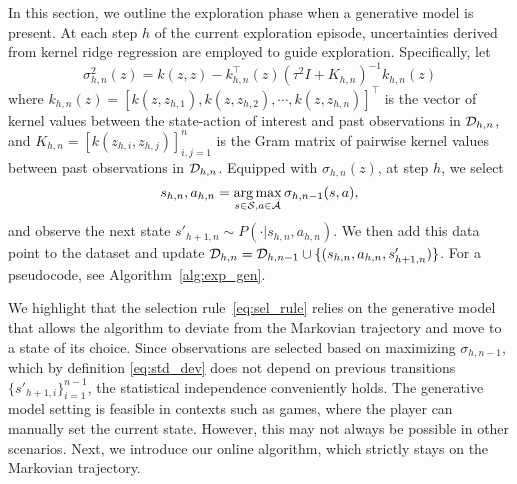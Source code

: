 In this section, we outline the exploration phase when a generative model is present. At each step $h$ of the current exploration episode, uncertainties derived from kernel ridge regression are employed to guide exploration. Specifically, let
\begin{equation} \label{eq:std_dev}
   \sigma^2_{h,n}(z) = k(z,z) -k^{\top}_{h,n}(z)(\tau^2I+K_{h,n})^{-1}k_{h,n}(z) 
\end{equation}
where $k_{h,n}(z) = [k(z,z_{h,1}),k(z,z_{h,2}), \cdots, k(z,z_{h,n}) ]^{\top}$ is the vector of kernel values between the state-action of interest and past observations in $\mathcal{D}_{h,n}$, and $K_{h,n}=[k(z_{h,i}, z_{h,j})]_{i,j=1}^n$ is the Gram matrix of pairwise kernel values between past observations in $\mathcal{D}_{h,n}$. Equipped with $\sigma_{h,n}(z)$, at step $h$, we select
\begin{equation}\label{eq:sel_rule}
    s_{h,n}, a_{h,n}=\operatorname*{arg\,max}_{s\in\mathcal{S},a\in\mathcal{A}} \sigma_{h,n-1}(s,a),
\end{equation}
and observe the next state $s'_{h+1,n}\sim P(\cdot|s_{h,n}, a_{h,n})$. We then add this data point to the dataset and update $\mathcal{D}_{h,n}=\mathcal{D}_{h,n-1}\cup\{(s_{h,n}, a_{h,n}, s'_{h+1,n})\}$. For a pseudocode, see Algorithm~\ref{alg:exp_gen}.

We highlight that the selection rule~\eqref{eq:sel_rule} relies on the generative model that allows the algorithm to deviate from the Markovian trajectory and move to a state of its choice. Since observations are selected based on maximizing $\sigma_{h,n-1}$, which by definition \eqref{eq:std_dev} does not depend on previous transitions $\{s'_{h+1,i}\}_{i=1}^{n-1}$,  the statistical independence conveniently holds. The generative model setting is feasible in contexts such as games, where the player can manually set the current state. However, this may not always be possible in other scenarios. Next, we introduce our online algorithm, which strictly stays on the Markovian trajectory.




